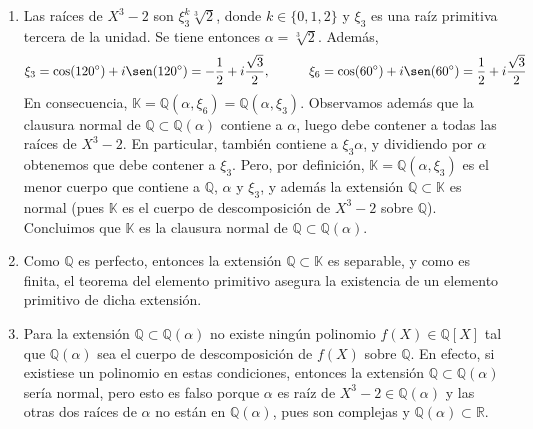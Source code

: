 \documentclass[11pt]{report}
\makeatletter
\renewenvironment{proof}[1][\proofname]{\par
  \pushQED{\qed}%
  \normalfont \topsep\z@skip %
  \trivlist
  \item[\hskip\labelsep
        \itshape
    #1\@addpunct{.}]\ignorespaces
}{%
  \popQED\endtrivlist\@endpefalse
}
\newcommand{\R}{\mathbb R}
\newcommand{\Q}{\mathbb Q}
\newcommand{\K}{\mathbb K}
\makeatother
\begin{document}
\begin{proof}
\hfill
\begin{enumerate}
    \item Las raíces de $X^3-2$ son $\xi_3^k\sqrt[3]{2}$, donde $k \in \{0,1,2\}$ y $\xi_3$ es una raíz primitiva tercera de la unidad. Se tiene entonces $\alpha = \sqrt[3]{2}$. Además,
    \[\xi_3 = \cos(120^\circ) +i\sen(120^\circ) = -\frac{1}{2}+i\frac{\sqrt{3}}{2}, \qquad \quad \xi_6 = \cos(60^\circ)+i\sen(60^\circ) = \frac{1}{2}+ i\frac{\sqrt{3}}{2}\]
    En consecuencia, $\K = \Q(\alpha,\xi_6) = \Q(\alpha,\xi_3)$. Observamos además que la clausura normal de $\Q \subset \Q(\alpha)$ contiene a $\alpha$, luego debe contener a todas las raíces de $X^3-2$. En particular, también contiene a $\xi_3\alpha$, y dividiendo por $\alpha$ obtenemos que debe contener a $\xi_3$. Pero, por definición, $\K = \Q(\alpha,\xi_3)$ es el menor cuerpo que contiene a $\Q$, $\alpha$ y $\xi_3$, y además la extensión $\Q \subset \K$ es normal (pues $\K$ es el cuerpo de descomposición de $X^3-2$ sobre $\Q$). Concluimos que $\K$ es la clausura normal de $\Q \subset \Q(\alpha)$.
    \item Como $\Q$ es perfecto, entonces la extensión $\Q \subset \K$ es separable, y como es finita, el teorema del elemento primitivo asegura la existencia de un elemento primitivo de dicha extensión.
    \item Para la extensión $\Q \subset \Q(\alpha)$ no existe ningún polinomio $f(X) \in \Q[X]$ tal que $\Q(\alpha)$ sea el cuerpo de descomposición de $f(X)$ sobre $\Q$. En efecto, si existiese un polinomio en estas condiciones, entonces la extensión $\Q \subset \Q(\alpha)$ sería normal, pero esto es falso porque $\alpha$ es raíz de $X^3-2 \in \Q(\alpha)$ y las otras dos raíces de $\alpha$ no están en $\Q(\alpha)$, pues son complejas y $\Q(\alpha) \subset \R$.
    

\end{enumerate}
\end{proof}
\end{document}
